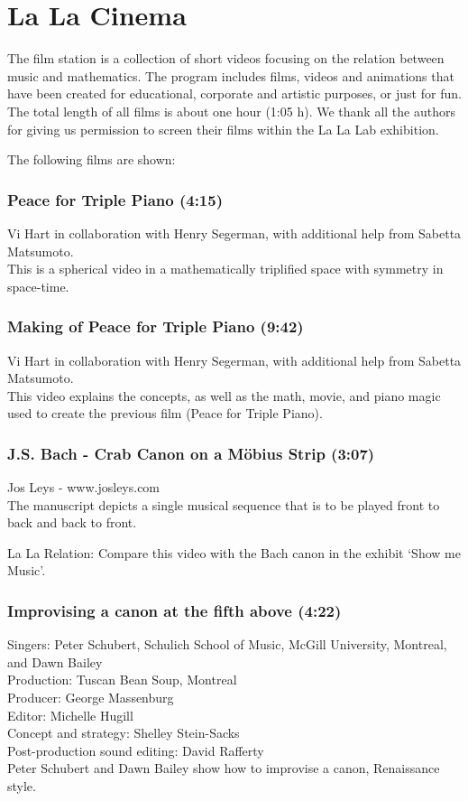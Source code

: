 \section{La La Cinema}

The film station is a collection of short videos focusing on the relation between music and mathematics. The program includes films, videos and animations that have been created for educational, corporate and artistic purposes, or just for fun. The total length of all films is about one hour (1:05 h). We thank all the authors for giving us permission to screen their films within the La La Lab exhibition.

The following films are shown:

\subsubsection*{Peace for Triple Piano (4:15)}
Vi Hart in collaboration with Henry Segerman, with additional help from Sabetta Matsumoto. \\
This is a spherical video in a mathematically triplified space with symmetry in space-time.

\subsubsection*{Making of Peace for Triple Piano (9:42)}
Vi Hart in collaboration with Henry Segerman, with additional help from Sabetta Matsumoto.\\
This video explains the concepts, as well as the math, movie, and piano magic used to create the previous film (Peace for Triple Piano).

\subsubsection*{J.S. Bach - Crab Canon on a Möbius Strip (3:07)}
Jos Leys - www.josleys.com \\
The manuscript depicts a single musical sequence that is to be played front to back and back to front.

La La Relation: Compare this video with the Bach canon in the exhibit `Show me Music'.

\subsubsection*{Improvising a canon at the fifth above (4:22)}
Singers: Peter Schubert, Schulich School of Music, McGill University, Montreal, and Dawn Bailey\\
Production: Tuscan Bean Soup, Montreal\\
Producer: George Massenburg\\
Editor: Michelle Hugill\\
Concept and strategy: Shelley Stein-Sacks\\
Post-production sound editing: David Rafferty\\
Peter Schubert and Dawn Bailey show how to improvise a canon, Renaissance style.

